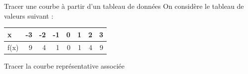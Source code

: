 \documentclass[presentation]{beamer}
\begin{document}
\begin{frame}[label={sec:org86fb354}]{Tracer une courbe à partir d'un tableau de données}
On considère le tableau de valeurs suivant :

\begin{center}
\begin{tabular}{l|r|r|r|r|r|r|r}
x & -3 & -2 & -1 & 0 & 1 & 2 & 3\\
\hline
f(x) & 9 & 4 & 1 & 0 & 1 & 4 & 9\\
\end{tabular}
\end{center}


Tracer la courbe représentative associée
\end{frame}
\end{document}
